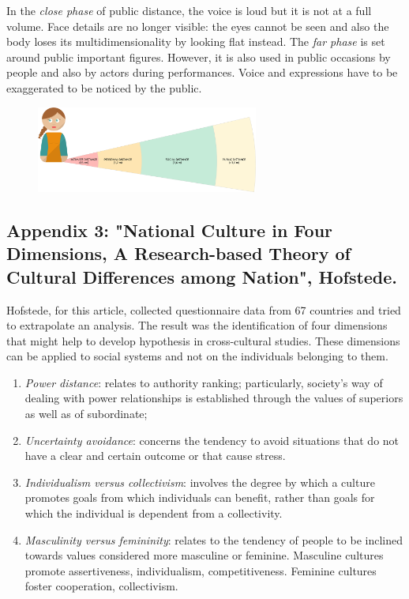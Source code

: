 \documentclass[../main.tex]{subfiles}
\begin{document}
In the \textit{close phase} of public distance, the voice is loud but it is not at a full volume. Face details are no longer visible: the eyes cannot be seen and also the body loses its multidimensionality by looking flat instead. The \textit{far phase} is set around public important figures. However, it is also used in public occasions by people and also by actors during performances. Voice and expressions have to be exaggerated to be noticed by the public.  

\begin{figure}[h]
    \centering\includegraphics[width=0.65\textwidth]{images/anna.pdf}
\end{figure}
\pagebreak

\subsection*{Appendix 3: "National Culture in Four Dimensions, A Research-based Theory of Cultural Differences among Nation", Hofstede.}

Hofstede, for this article, collected questionnaire data from 67 countries and tried to extrapolate an analysis. The result was the identification of four dimensions that might help to develop hypothesis in cross-cultural studies. These dimensions can be applied to social systems and not on the individuals belonging to them.
\begin{enumerate}
\item \textit{Power distance}: relates to authority ranking; particularly, society's way of dealing with power relationships is established through the values of superiors as well as of subordinate; %
\item \textit{Uncertainty avoidance}: concerns the tendency to avoid situations that do not have a clear and certain outcome or that cause stress.
\item \textit{Individualism versus collectivism}: involves the degree by which a culture promotes goals from which individuals can benefit, rather than goals for which the individual is dependent from a collectivity. %
\item \textit{Masculinity versus femininity}: relates to the tendency of people to be inclined towards values considered more masculine or feminine. Masculine cultures promote assertiveness, individualism, competitiveness. Feminine cultures foster cooperation, collectivism.
\end{enumerate}
\end{document}
